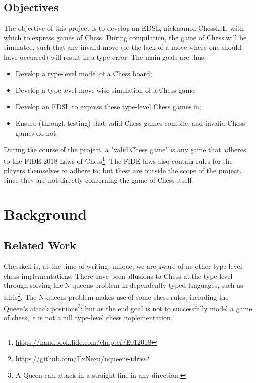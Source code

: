 \documentclass[12pt, a4paper, bibliography=totocnumbered]{scrreprt}
\begin{document}
\chapter{Objectives}

The objective of this project is to develop an EDSL, nicknamed Chesskell, with which to express games of Chess. During compilation, the game of Chess will be simulated, such that any invalid move (or the lack of a move where one should have occurred) will result in a type error. The main goals are thus:

\begin{itemize}
    \item Develop a type-level model of a Chess board;
    \item Develop a type-level move-wise simulation of a Chess game;
    \item Develop an EDSL to express these type-level Chess games in;
    \item Ensure (through testing) that valid Chess games compile, and invalid Chess games do not.
\end{itemize}

During the course of the project, a "valid Chess game" is any game that adheres to the FIDE 2018 Laws of Chess\footnote{\url{https://handbook.fide.com/chapter/E012018}}. The FIDE laws also contain rules for the players themselves to adhere to; but these are outside the scope of the project, since they are not directly concerning the game of Chess itself.

\part{Background}

\chapter{Related Work}

Chesskell is, at the time of writing, unique; we are aware of no other type-level chess implementations. There have been allusions to Chess at the type-level through solving the N-queens problem in dependently typed languages, such as Idris\footnote{\url{https://github.com/ExNexu/nqueens-idris}}. The N-queens problem makes use of some chess rules, including the Queen's attack positions\footnote{A Queen can attack in a straight line in any direction.}; but as the end goal is not to successfully model a game of chess, it is not a full type-level chess implementation.
\end{document}
